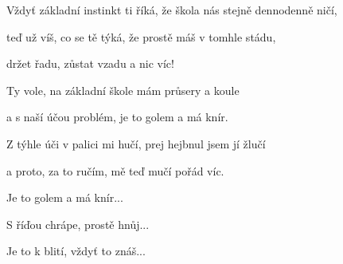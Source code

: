 \zr
Vždyť základní instinkt ti říká, že škola nás stejně dennodenně ničí,

teď už víš, co se tě týká, že prostě máš v tomhle stádu,

držet řadu, zůstat vzadu a nic víc!
\kr 

\zs
Ty vole, na základní škole mám průsery a koule 

a s naší účou problém, je to golem a má knír.
\ks

\zs
Z týhle úči v palici mi hučí, prej hejbnul jsem jí žlučí 

a proto, za to ručím, mě teď mučí pořád víc.

Je to golem a má knír...
 
S říďou chrápe, prostě hnůj...
 
Je to k blití, vždyť to znáš...
\ks

\kp

